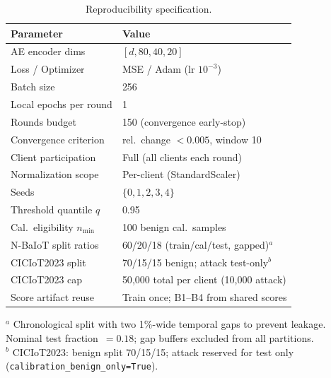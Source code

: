 \begin{table}[t]
  \caption{Reproducibility specification.}
  \label{tab:repro}
  \centering
  \footnotesize
  \renewcommand{\arraystretch}{1.15}%
  \setlength{\tabcolsep}{4pt}%
  \begin{tabular}{@{}lp{}@{}}
    \toprule
    Parameter & Value \\
    \midrule
    AE encoder dims & $[d, 80, 40, 20]$ \\
    Loss / Optimizer & MSE / Adam (lr $10^{-3}$) \\
    Batch size & 256 \\
    Local epochs per round & 1 \\
    Rounds budget & 150 (convergence early-stop) \\
    Convergence criterion & rel.\ change $< 0.005$, window 10 \\
    Client participation & Full (all clients each round) \\
    Normalization scope & Per-client (StandardScaler) \\
    Seeds & $\{0, 1, 2, 3, 4\}$ \\
    Threshold quantile $q$ & 0.95 \\
    Cal.\ eligibility $n_{\min}$ & 100 benign cal.\ samples \\
    N-BaIoT split ratios & 60/20/18 (train/cal/test, gapped)$^{a}$ \\
    CICIoT2023 split & 70/15/15 benign; attack test-only$^{b}$ \\
    CICIoT2023 cap & 50{,}000 total per client (10{,}000 attack) \\
    Score artifact reuse & Train once; B1--B4 from shared scores \\
    \bottomrule
  \end{tabular}
  \par\vspace{2pt}
  \parbox{\columnwidth}{\footnotesize
    $^{a}$ Chronological split with two 1\%-wide temporal gaps to prevent leakage.
    Nominal test fraction~$= 0.18$; gap buffers excluded from all partitions.\\[1pt]
    $^{b}$ CICIoT2023: benign split 70/15/15; attack reserved for test only
    (\texttt{calibration\_benign\_only=True}).
  }
\end{table}
